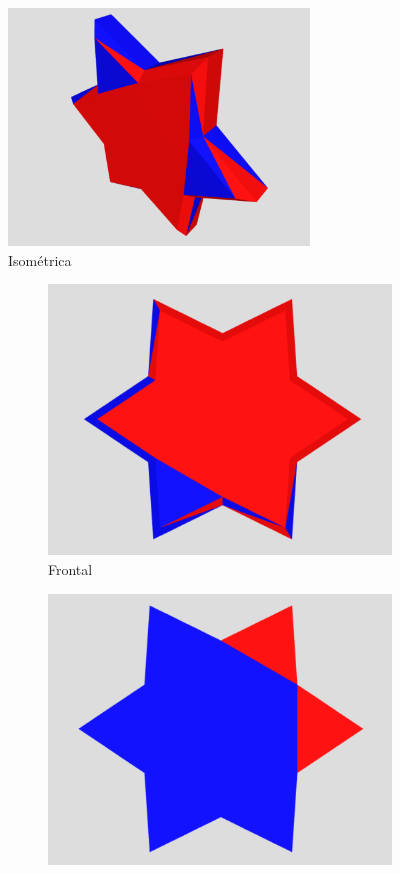 \documentclass{article}
\begin{document}
\begin{figure}[H]
\centering
\includegraphics[width=80mm]{star_1_2.png}
\caption{\label{fig1}Isométrica}
\end{figure}

\begin{figure}[H]
\centering
\begin{subfigure}[b]{0.45\linewidth}
\includegraphics[width=\linewidth]{star_6.png}
\caption{Frontal}
\end{subfigure}
\begin{subfigure}[b]{0.45\linewidth}
\includegraphics[width=\linewidth]{star_6_1.png}

\end{subfigure}
\end{figure}
\end{document}
